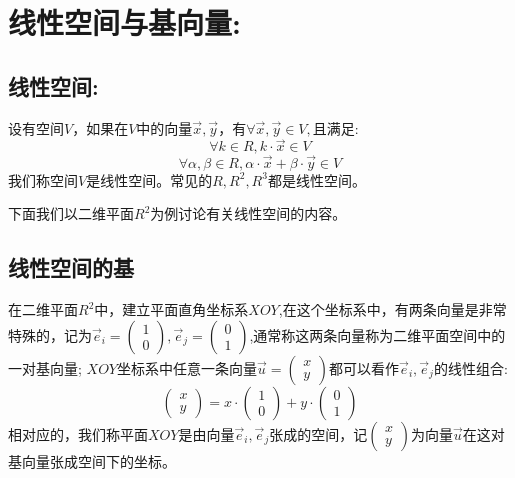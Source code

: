 \documentclass[UTF8]{article}
\begin{document}
 


\section{线性空间与基向量:}
\subsection{线性空间:}

设有空间$V$，如果在$V$中的向量$\vec{x}, \vec{y}$，有$\forall \vec{x}, \vec{y} \in V,$且满足:
$$\forall k \in R, k\cdot \vec{x} \in V$$
$$\forall \alpha,\beta \in R, \alpha\cdot \vec{x} + \beta\cdot\vec{y} \in V$$
我们称空间$V$是线性空间。常见的$R, R^2, R^3$都是线性空间。

下面我们以二维平面$R^2$为例讨论有关线性空间的内容。

\subsection{线性空间的基} 
在二维平面$R^2$中，建立平面直角坐标系$XOY$,在这个坐标系中，有两条向量是非常特殊的，记为$\vec{e}_i = 
\left(
\begin{array}{l}
1 \\ 
0
\end{array}
\right),
\vec{e}_j = 
\left(
\begin{array}{l}
0 \\ 
1
\end{array}
\right)$,通常称这两条向量称为二维平面空间中的一对基向量;
$XOY$坐标系中任意一条向量$\vec{u} = 
\left(
\begin{array}{l}
x \\ 
y
\end{array}
\right)
$都可以看作$\vec{e}_i, \vec{e}_j$的线性组合:
$$
\left(
\begin{array}{l}
x \\ 
y
\end{array}
\right) = x\cdot
\left(
\begin{array}{l}
1 \\ 
0
\end{array}
\right) + y\cdot
\left(
\begin{array}{l}
0 \\ 
1
\end{array}
\right)
$$
相对应的，我们称平面$XOY$是由向量$\vec{e}_i, \vec{e}_j$张成的空间，记$
\left(
\begin{array}{l}
x \\ 
y
\end{array}
\right)
$为向量$\vec{u}$在这对基向量张成空间下的坐标。
\end{document}

